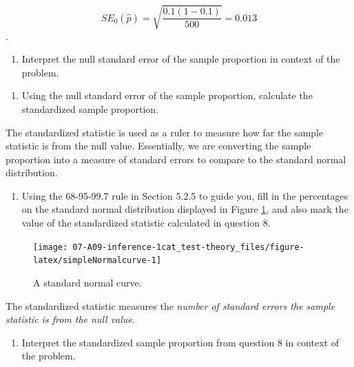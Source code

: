\documentclass[
]{report}
\providecommand{\tightlist}{%
  \setlength{\itemsep}{0pt}\setlength{\parskip}{0pt}}
\begin{document}
\[SE_0(\hat{p})=\sqrt{\frac{0.1(1-0.1)}{500}} = 0.013\].

\begin{enumerate}
\def\labelenumi{\arabic{enumi}.}
\setcounter{enumi}{6}
\tightlist
\item
  Interpret the null standard error of the sample proportion in context of the problem.
\end{enumerate}

\vspace{0.6in}

\begin{enumerate}
\def\labelenumi{\arabic{enumi}.}
\setcounter{enumi}{7}
\tightlist
\item
  Using the null standard error of the sample proportion, calculate the standardized sample proportion.
\end{enumerate}

\vspace{0.6in}

The standardized statistic is used as a ruler to measure how far the sample statistic is from the null value. Essentially, we are converting the sample proportion into a measure of standard errors to compare to the standard normal distribution.

\begin{enumerate}
\def\labelenumi{\arabic{enumi}.}
\setcounter{enumi}{8}
\tightlist
\item
  Using the 68-95-99.7 rule in Section 5.2.5 to guide you, fill in the percentages on the standard normal distribution displayed in Figure \ref{fig:simpleNormalcurve}, and also mark the value of the standardized statistic calculated in question 8.
\end{enumerate}

\begin{figure}

{\centering \texttt{[image: 07-A09-inference-1cat\_test-theory\_files/figure-latex/simpleNormalcurve-1]} 

}

\caption{A standard normal curve.}\label{fig:simpleNormalcurve}
\end{figure}

\newpage

The standardized statistic measures the \emph{number of standard errors the sample statistic is from the null value}.

\begin{enumerate}
\def\labelenumi{\arabic{enumi}.}
\setcounter{enumi}{9}
\tightlist
\item
  Interpret the standardized sample proportion from question 8 in context of the problem.
\end{enumerate}
\end{document}
